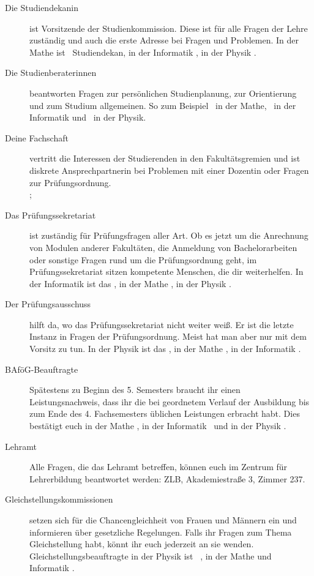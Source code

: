 \begin{description}
\item[Die Studiendekanin] ist Vorsitzende der Studienkommission. Diese ist für alle Fragen der Lehre zuständig und auch die erste Adresse bei Fragen und Problemen. In der Mathe ist \studiendekanmathe\ Studiendekan, in der Informatik \studiendekaninformatik , in der Physik \studiendekanphysik .

\item[Die Studienberaterinnen] beantworten Fragen zur persönlichen Studienplanung, zur Orientierung und zum Studium allgemeinen. So zum Beispiel \studienberatungmathe\ in der Mathe, \studienberatunginformatik\ in der Informatik und \studienberatungphysik\ in der Physik.

\item[Deine Fachschaft] vertritt die Interessen der Studierenden in den Fakultätsgremien und ist diskrete Ansprechpartnerin bei Problemen mit einer Dozentin oder Fragen zur Prüfungsordnung. \\\fsraum; 

\item[Das Prüfungssekretariat] ist zuständig für Prüfungsfragen aller Art. Ob es jetzt um die Anrechnung von Modulen anderer Fakultäten, die Anmeldung von Bachelorarbeiten oder sonstige Fragen rund um die Prüfungsordnung geht, im Prüfungssekretariat sitzen kompetente Menschen, die dir weiterhelfen. In der Informatik ist das \pruefsekinfo, in der Mathe \pruefsekmathe, in der Physik \pruefsekphysik.

\item[Der Prüfungsausschuss] hilft da, wo das Prüfungssekretariat nicht weiter weiß. Er ist die letzte Instanz in Fragen der Prüfungsordnung. Meist hat man aber nur mit dem Vorsitz zu tun. In der Physik ist das \pruefausschussvorsitzphysik, in der Mathe \pruefausschussvorsitzmathe, in der Informatik \pruefausschussvorsitzinformatik.

\item[BAföG-Beauftragte] Spätestens zu Beginn des 5. Semesters braucht ihr einen Leistungsnachweis, dass ihr die bei geordnetem Verlauf der Ausbildung bis zum Ende des 4. Fachsemesters üblichen Leistungen erbracht habt. Dies bestätigt euch in der Mathe \bafogmathe , in der Informatik \bafoginformatik\ und in der Physik \bafogphysik .

\item[Lehramt] Alle Fragen, die das Lehramt betreffen, können euch im Zentrum für Lehrerbildung beantwortet werden: ZLB, Akademiestraße 3, Zimmer 237.

\item[Gleichstellungskommissionen] setzen sich für die Chancengleichheit von Frauen und Männern ein und informieren über gesetzliche Regelungen. Falls ihr Fragen zum Thema Gleichstellung habt, könnt ihr euch jederzeit an sie wenden. Gleichstellungsbeauftragte in der Physik ist \gleichstellungsbeauftragtephysik\ , in der Mathe und Informatik \gleichstellungsbeauftragtemathe.

\end{description}


